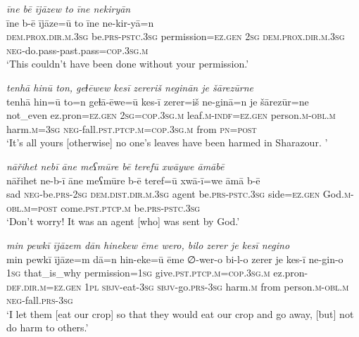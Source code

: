 \ea \label{PM.30}
\textit{īne bē ījāzew to īne nekiryān} \\ 
\gll īne b-ē ījāze=ū to īne ne-kir-yā=n \\ 
 \textsc{dem.prox}\textsc{.dir}\textsc{.m}\textsc{.3sg} be\textsc{.prs}\textsc{-pstc}\textsc{.3sg} permission\textsc{\textsc{=ez.gen}} \textsc{2sg} \textsc{dem.prox}\textsc{.dir}\textsc{.m}\textsc{.3sg} \textsc{neg-}do.pass-past.pass\textsc{=cop}\textsc{.3sg}\textsc{.m} \\ 
\glt `This couldn’t have been done without your permission.'
\z 
 
\ea \label{PM.31}
\textit{tenhā hinū ton, geɫēwew kesī zereriš neginān je šārezūrne} \\ 
\gll tenhā hin=ū to=n geɫā-ēwe=ū kes-ī zerer=iš ne-ginā=n je šārezūr=ne \\ 
 not\_even ez.pron\textsc{\textsc{=ez.gen}} \textsc{2sg}\textsc{=cop}\textsc{.3sg}\textsc{.m} leaf\textsc{.m}\textsc{-indf}\textsc{\textsc{=ez.gen}} person\textsc{.m}\textsc{-obl}\textsc{.m} harm\textsc{.m}\textsc{=3sg} \textsc{neg-}fall\textsc{.pst}\textsc{.ptcp}\textsc{.m}\textsc{=cop}\textsc{.3sg}\textsc{.m} from \textsc{pn}\textsc{=\textsc{post}} \\ 
\glt `It’s all yours [otherwise] no one’s leaves have been harmed in Sharazour. '
\z 
 
\ea \label{PM.34}
\textit{nāřihet nebī āne meʕmūre bē terefū xwāywe āmābē} \\ 
\gll nāřihet ne-b-ī āne meʕmūre b-ē teref=ū xwā-ī=we āmā b-ē \\ 
 sad \textsc{neg-}be\textsc{.prs}-\textsc{2sg} \textsc{dem.dist}\textsc{.dir}\textsc{.m}\textsc{.3sg} agent be\textsc{.prs}\textsc{-pstc}\textsc{.3sg} side\textsc{\textsc{=ez.gen}} God\textsc{.m}\textsc{-obl}\textsc{.m}\textsc{=\textsc{post}} come\textsc{.pst}\textsc{.ptcp}\textsc{.m} be\textsc{.prs}\textsc{-pstc}\textsc{.3sg} \\ 
\glt `Don’t worry! It was an agent [who] was sent  by God.'
\z 
 
\ea \label{PM.36}
\textit{min pewkī ījāzem dān hinekew ēme wero, bilo zerer je kesī negino} \\ 
\gll min pewkī ījāze=m dā=n hin-eke=ū ēme ∅-wer-o bi-l-o zerer je kes-ī ne-gin-o \\ 
 \textsc{1sg} that\_is\_why permission\textsc{=\textsc{1sg}} give\textsc{.pst}\textsc{.ptcp}\textsc{.m}\textsc{=cop}\textsc{.3sg}\textsc{.m} ez.pron\textsc{-def}\textsc{.dir}\textsc{.m}\textsc{\textsc{=ez.gen}} \textsc{1pl} \textsc{sbjv-}eat\textsc{-3sg} \textsc{sbjv-}go\textsc{.prs}\textsc{-3sg} harm\textsc{.m} from person\textsc{.m}\textsc{-obl}\textsc{.m} \textsc{neg-}fall\textsc{.prs}\textsc{-3sg} \\ 
\glt `I let them [eat our crop] so that they would eat our crop and go away, [but] not do harm to others.'
\z 
 
